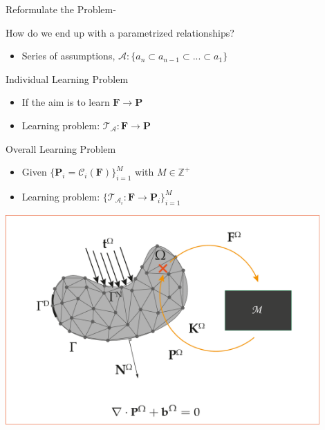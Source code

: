 \begin{frame}{Reformulate the Problem-}
  \begin{minipage}{0.5\textwidth}
{
    \begin{block}{\color{White} How do we end up with a parametrized relationships?}
      \begin{itemize}
        \item Series of assumptions, $\mathcal{A}:\{a_n \subset a_{n-1} \subset ... \subset a_1\}$ 
     \end{itemize}
    \end{block} 
    \begin{block}{\color{White} Individual Learning Problem}
      \begin{itemize}
        \item If the aim is to learn $\mathbf{F} \to \mathbf{P}$ 
        \item Learning problem: $\mathcal{T}_\mathcal{A}:\mathbf{F} \to \mathbf{P}$
      \end{itemize}
    \end{block}
}
{
    \begin{block}{\color{White} Overall Learning Problem}
      \begin{itemize}
        \item Given $\{\mathbf{P}_i=\mathcal{C}_i(\mathbf{F})\}_{i=1}^{M}$ with $M\in\mathbb{Z}^+$
        \item Learning problem: $\{\mathcal{T}_{\mathcal{A}_i}:\mathbf{F} \to \mathbf{P}_i\}_{i=1}^{M}$
      \end{itemize}
    \end{block} 
}
  \end{minipage}%
  \begin{minipage}{0.5\textwidth}
    \centering
    \includegraphics[width=0.9\textwidth]{Figures/literature/FE2-ML.pdf} 
  \end{minipage}
\end{frame}

